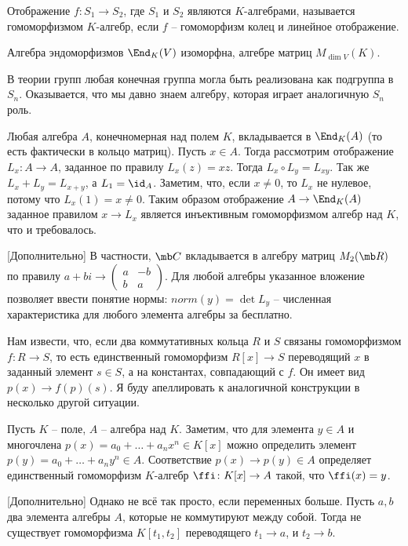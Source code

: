 \dfn Отображение $f \colon S_1 \to S_2$, где $S_1$ и $S_2$ являются $K$-алгебрами, называется гомоморфизмом $K$-алгебр, если $f$ -- гомоморфизм колец и линейное отображение.
\edfn



\rm Алгебра эндоморфизмов $\End_K (V)$  изоморфна,  алгебре матриц $M_{\dim V}(K)$.
\erm

В теории групп любая конечная группа могла быть реализована как подгруппа в $S_n$. Оказывается, что мы давно знаем алгебру, которая играет аналогичную $S_n$ роль.



 Любая алгебра $A$, конечномерная над полем $K$, вкладывается в $\End_K(A)$ (то есть фактически в кольцо матриц).
\proof Пусть $x\in A$. Тогда рассмотрим отображение $L_x \colon A \to A$, заданное по правилу $L_x(z)=xz$. Тогда $L_x\circ L_y=L_{xy}$. Так же $L_x+L_y=L_{x+y}$, а $L_1=\id_A$. Заметим, что, если $x\neq 0$, то $L_x$ не нулевое, потому что $L_x(1)=x\neq 0$. Таким образом отображение $A \to \End_K(A)$ заданное правилом $x\to L_x$ является инъективным гомоморфизмом алгебр над $K$, что и требовалось.
\endproof
\ethrm

\rm[Дополнительно] В частности, $\mb C$ вкладывается в алгебру матриц $M_2(\mb R)$ по правилу $a+bi \to \left( \begin{smallmatrix} a &-b\\ b & a \end{smallmatrix}\right) $. Для любой алгебры указанное вложение позволяет ввести понятие нормы: $norm (y)=\det L_y$ -- численная характеристика для любого элемента алгебры за бесплатно. 
\erm



Нам извести, что, если  два коммутативных кольца $R$ и $S$  связаны гомоморфизмом $f\colon R \to S$, то есть единственный гомоморфизм $R[x] \to S$ переводящий $x$ в заданный элемент $s \in S$, а на константах, совпадающий с $f$. Он имеет вид $p(x) \to f(p)(s)$. Я буду апеллировать к аналогичной конструкции в несколько другой ситуации.

\rm
Пусть $K$ -- поле, $A$ -- алгебра над $K$. Заметим, что для элемента $y \in A$ и многочлена $p(x)=a_0+\dots+a_n x^n\in K[x]$ можно определить элемент $p(y)=a_0+\dots+a_n y^n \in A$. Соответствие $p(x) \to p(y)\in A$ определяет единственный гомоморфизм $K$-алгебр $\ffi \colon K[x]\to A$ такой, что $\ffi(x)= y$.
\erm



\rm[Дополнительно] Однако не всё так просто, если переменных больше. Пусть $a,b$ два элемента алгебры $A$, которые не коммутируют между собой. Тогда не существует гомоморфизма $K[t_1,t_2]$ переводящего $t_1\to a$, и $t_2 \to b$.
\erm

